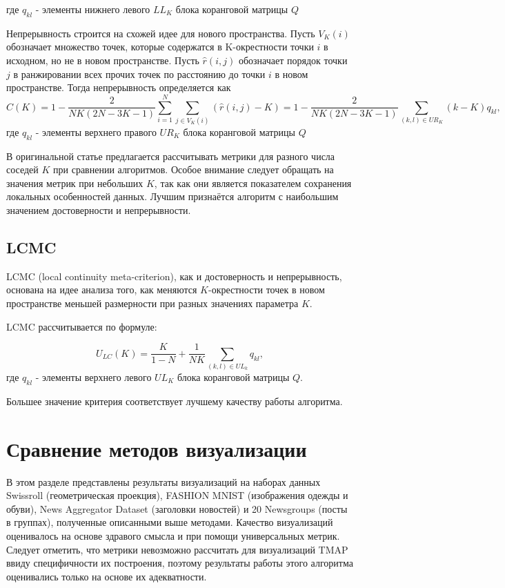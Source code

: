 \documentclass[10pt, a4paper]{extarticle}
\begin{document}
где $q_{kl}$ - элементы  нижнего левого $LL_K$ блока коранговой матрицы $Q$

Непрерывность строится на схожей идее для нового пространства. Пусть $V_K(i)$ обозначает множество точек, которые содержатся в K-окрестности точки $i$ в исходном, но не в новом пространстве. Пусть $\hat{r}(i, j)$ обозначает порядок точки $j$ в ранжировании всех прочих точек по расстоянию до точки $i$ в новом пространстве. 
Тогда непрерывность определяется как
\[
C(K) = 1 - \dfrac{2}{NK(2N - 3K - 1)}\sum_{i=1}^N \sum_{j \in V_K(i)}(\hat{r}(i, j) - K)=1-\frac{2}{NK(2N - 3K - 1)} \sum_{(k, l) \in U R_{K}}(k-K) q_{k l},
\]
где $q_{kl}$ - элементы  верхнего правого $UR_K$ блока коранговой матрицы $Q$

В оригинальной статье предлагается рассчитывать метрики для разного числа соседей $K$ при сравнении алгоритмов. Особое внимание следует обращать на значения метрик при небольших $K$, так как они является показателем сохранения локальных особенностей данных. Лучшим признаётся алгоритм с наибольшим значением достоверности и непрерывности.

\subsection{LCMC}
LCMC (local continuity meta-criterion), как и достоверность и непрерывность, основана на идее анализа того, как меняются $K$-окрестности точек в новом пространстве меньшей размерности при разных значениях параметра $K$.

LCMC рассчитывается по формуле:

\[
U_{LC}(K) = \frac{K}{1-N} + \frac{1}{NK}\sum_{(k,l)\in UL_k}q_{kl},
\]
где $q_{kl}$ - элементы  верхнего левого $UL_K$ блока коранговой матрицы $Q$.

Большее значение критерия соответствует лучшему качеству работы алгоритма.


\section{Сравнение методов визуализации}
В этом разделе представлены результаты визуализаций на наборах данных Swissroll (геометрическая проекция), FASHION MNIST (изображения одежды и обуви), News Aggregator Dataset (заголовки новостей) и 20 Newsgroups (посты в группах), полученные описанными выше методами. 
Качество визуализаций оценивалось на основе здравого смысла и при помощи универсальных метрик. 
Следует отметить, что метрики невозможно рассчитать для визуализаций TMAP ввиду специфичности их построения, поэтому результаты работы этого алгоритма оценивались только на основе их адекватности. 
\end{document}
